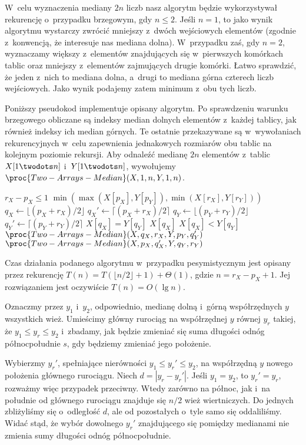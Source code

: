 W~celu wyznaczenia mediany $2n$ liczb nasz algorytm będzie wykorzystywał rekurencję o~przypadku brzegowym, gdy $n\le2$.
Jeśli $n=1$, to jako wynik algorytmu wystarczy zwrócić mniejszy z~dwóch wejściowych elementów (zgodnie z~konwencją, że interesuje nas mediana dolna).
W~przypadku zaś, gdy $n=2$, wyznaczamy większy z~elementów znajdujących się w~pierwszych komórkach tablic oraz mniejszy z~elementów zajmujących drugie komórki.
Łatwo sprawdzić, że jeden z~nich to mediana dolna, a~drugi to mediana górna czterech liczb wejściowych.
Jako wynik podajemy zatem minimum z~obu tych liczb.

Poniższy pseudokod implementuje opisany algorytm.
Po sprawdzeniu warunku brzegowego obliczane są indeksy median dolnych elementów z~każdej tablicy, jak również indeksy ich median górnych.
Te ostatnie przekazywane są w~wywołaniach rekurencyjnych w~celu zapewnienia jednakowych rozmiarów obu tablic na kolejnym poziomie rekursji.
Aby odnaleźć medianę $2n$ elementów z~tablic $X[1\twodots n]$ i~$Y[1\twodots n]$, wywołujemy $\proc{Two-Arrays-Median}(X,1,n,Y,1,n)$.

\begin{codebox}
\li	\If $r_X-p_X\le1$
\li		\Then \Return $\min(\max(X[p_X],Y[p_Y]),\min(X[r_X],Y[r_Y]))$
		\End
\li	$q_X\gets\lfloor(p_X+r_X)/2\rfloor$
\li	$q_X'\gets\lceil(p_X+r_X)/2\rceil$
\li	$q_Y\gets\lfloor(p_Y+r_Y)/2\rfloor$
\li	$q_Y'\gets\lceil(p_Y+r_Y)/2\rceil$
\li	\If $X[q_X]=Y[q_Y]$
\li		\Then \Return $X[q_X]$
		\End
\li	\If $X[q_X]<Y[q_Y]$
\li		\Then \Return $\proc{Two-Arrays-Median}(X,q_X,r_X,Y,p_Y,q_Y')$
\li		\Else \Return $\proc{Two-Arrays-Median}(X,p_X,q_X',Y,q_Y,r_Y)$
		\End
\end{codebox}

Czas działania podanego algorytmu w~przypadku pesymistycznym jest opisany przez rekurencję $T(n)=T(\lfloor n/2\rfloor+1)+\Theta(1)$, gdzie $n=r_X-p_X+1$.
Jej rozwiązaniem jest oczywiście $T(n)=O(\lg n)$.

\exercise %
Oznaczmy przez $y_1$ i~$y_2$, odpowiednio, medianę dolną i~górną współrzędnych $y$ wszystkich wież.
Umieścimy główny rurociąg na współrzędnej $y$ równej $y_r$ takiej, że $y_1\le y_r\le y_2$ i~zbadamy, jak będzie zmieniać się suma długości odnóg północ\nbhyphen południe $s$, gdy będziemy zmieniać jego położenie.

Wybierzmy $y_r'$, spełniające nierówności $y_1\le y_r'\le y_2$, na współrzędną $y$ nowego położenia głównego rurociągu.
Niech $d=|y_r-y_r'|$.
Jeśli $y_1=y_2$, to $y_r'=y_r$, rozważmy więc przypadek przeciwny.
Wtedy zarówno na północ, jak i~na południe od głównego rurociągu znajduje się $n/2$ wież wiertniczych.
Do jednych zbliżyliśmy się o~odległość $d$, ale od pozostałych o~tyle samo się oddaliliśmy.
Widać stąd, że wybór dowolnego $y_r'$ znajdującego się pomiędzy medianami nie zmienia sumy długości odnóg północ\nbhyphen południe.


